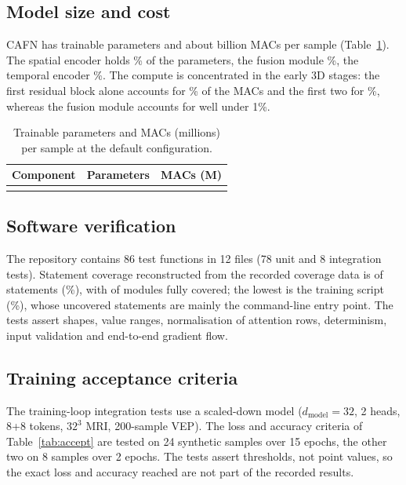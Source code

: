 \documentclass{ieeeaccessapprox}
\begin{document}
\subsection{Model size and cost}
CAFN has \nParams{} trainable parameters and about \nMACsG{} billion MACs per sample (Table~\ref{tab:params}). The spatial encoder holds \pSpatial\% of the parameters, the fusion module \pFusion\%, the temporal encoder \pTemporal\%. The compute is concentrated in the early 3D stages: the first residual block alone accounts for \pBlockOne\% of the MACs and the first two for \pBlocksOneTwo\%, whereas the fusion module accounts for well under 1\%.

\begin{table}[!t]
\caption{Trainable parameters and MACs (millions) per sample at the default configuration.}
\label{tab:params}
\centering\footnotesize
\begin{tabular}{@{}lrr@{}}
\toprule
Component & Parameters & MACs (M)\\
\midrule
\\
\bottomrule
\end{tabular}
\end{table}

\subsection{Software verification}
The repository contains 86 test functions in 12 files (78 unit and 8 integration tests). Statement coverage reconstructed from the recorded coverage data is \nHit{} of \nStmts{} statements (\covTotal\%), with \nFullMods{} of \nMods{} modules fully covered; the lowest is the training script (\covTrain\%), whose uncovered statements are mainly the command-line entry point. The tests assert shapes, value ranges, normalisation of attention rows, determinism, input validation and end-to-end gradient flow.

\subsection{Training acceptance criteria}
The training-loop integration tests use a scaled-down model ($d_{\mathrm{model}}=32$, 2 heads, 8+8 tokens, $32^3$ MRI, 200-sample VEP). The loss and accuracy criteria of Table~\ref{tab:accept} are tested on 24 synthetic samples over 15 epochs, the other two on 8 samples over 2 epochs. The tests assert thresholds, not point values, so the exact loss and accuracy reached are not part of the recorded results.
\end{document}
